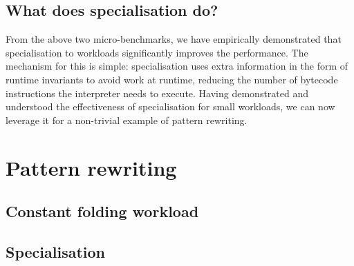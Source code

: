 \subsection{What does specialisation do?}
\label{ssec:specialising-what-do}

From the above two micro-benchmarks, we have empirically demonstrated that specialisation to workloads significantly improves the performance.
The mechanism for this is simple: specialisation uses extra information in the form of runtime invariants to avoid work at runtime, reducing the number of bytecode instructions the interpreter needs to execute.
Having demonstrated and understood the effectiveness of specialisation for small workloads, we can now leverage it for a non-trivial example of pattern rewriting.




\section{Pattern rewriting}
\label{sec:specialising-pattern-rewriting}


\subsection{Constant folding workload}
\label{sec:specialising-pattern-rewriting-workload}




\subsection{Specialisation}
\label{sec:specialising-pattern-rewriting-specialisation}



